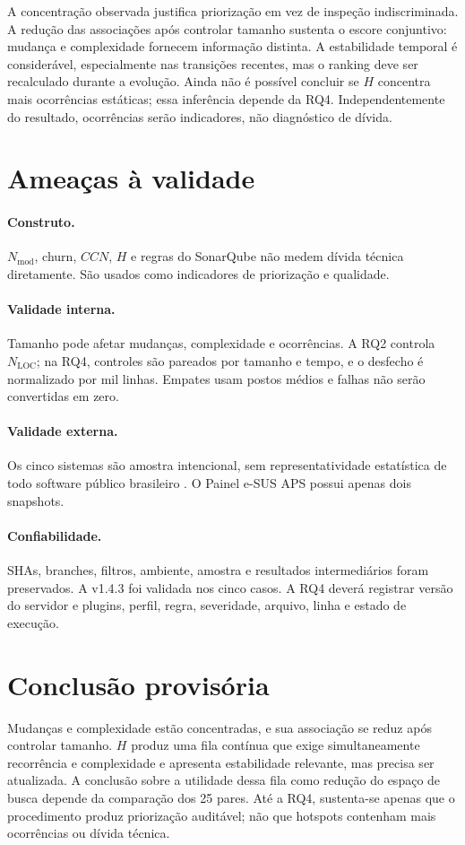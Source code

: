 \documentclass[12pt]{article}
\newcommand{\Nmod}{\ensuremath{N_{\mathrm{mod}}}}
\newcommand{\NLOC}{\ensuremath{N_{\mathrm{LOC}}}}
\newcommand{\CCN}{\ensuremath{CCN}}
\begin{document}
A concentração observada justifica priorização em vez de inspeção indiscriminada. A redução das associações após controlar tamanho sustenta o escore conjuntivo: mudança e complexidade fornecem informação distinta. A estabilidade temporal é considerável, especialmente nas transições recentes, mas o ranking deve ser recalculado durante a evolução. Ainda não é possível concluir se $H$ concentra mais ocorrências estáticas; essa inferência depende da RQ4. Independentemente do resultado, ocorrências serão indicadores, não diagnóstico de dívida.

\section{Ameaças à validade}

\paragraph{Construto.} \Nmod{}, churn, \CCN{}, $H$ e regras do SonarQube não medem dívida técnica diretamente. São usados como indicadores de priorização e qualidade.

\paragraph{Validade interna.} Tamanho pode afetar mudanças, complexidade e ocorrências. A RQ2 controla \NLOC{}; na RQ4, controles são pareados por tamanho e tempo, e o desfecho é normalizado por mil linhas. Empates usam postos médios e falhas não serão convertidas em zero.

\paragraph{Validade externa.} Os cinco sistemas são amostra intencional, sem representatividade estatística de todo software público brasileiro \cite{baltes2022sampling}. O Painel e-SUS APS possui apenas dois snapshots.

\paragraph{Confiabilidade.} SHAs, branches, filtros, ambiente, amostra e resultados intermediários foram preservados. A v1.4.3 foi validada nos cinco casos. A RQ4 deverá registrar versão do servidor e plugins, perfil, regra, severidade, arquivo, linha e estado de execução.

\section{Conclusão provisória}

Mudanças e complexidade estão concentradas, e sua associação se reduz após controlar tamanho. $H$ produz uma fila contínua que exige simultaneamente recorrência e complexidade e apresenta estabilidade relevante, mas precisa ser atualizada. A conclusão sobre a utilidade dessa fila como redução do espaço de busca depende da comparação dos 25 pares. Até a RQ4, sustenta-se apenas que o procedimento produz priorização auditável; não que hotspots contenham mais ocorrências ou dívida técnica.



\end{document}
